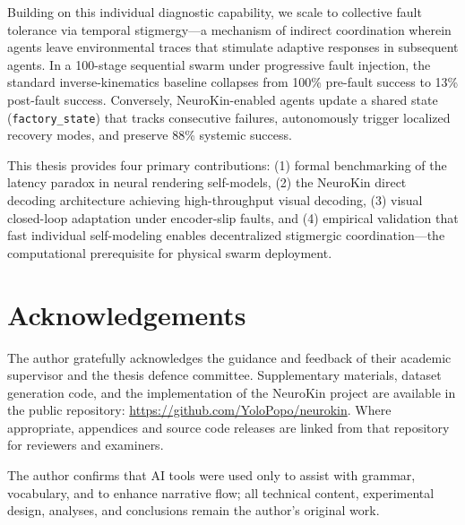 \documentclass[12pt,a4paper,oneside]{report}
\begin{document}
Building on this individual diagnostic capability, we scale to collective fault tolerance via temporal stigmergy—a mechanism of indirect coordination wherein agents leave environmental traces that stimulate adaptive responses in subsequent agents. In a 100-stage sequential swarm under progressive fault injection, the standard inverse-kinematics baseline collapses from 100\% pre-fault success to 13\% post-fault success. Conversely, NeuroKin-enabled agents update a shared state (\texttt{factory\_state}) that tracks consecutive failures, autonomously trigger localized recovery modes, and preserve 88\% systemic success.

This thesis provides four primary contributions: (1) formal benchmarking of the latency paradox in neural rendering self-models, (2) the NeuroKin direct decoding architecture achieving high-throughput visual decoding, (3) visual closed-loop adaptation under encoder-slip faults, and (4) empirical validation that fast individual self-modeling enables decentralized stigmergic coordination—the computational prerequisite for physical swarm deployment.

\clearpage

\chapter*{Acknowledgements}

The author gratefully acknowledges the guidance and feedback of their academic supervisor and the thesis defence committee. Supplementary materials, dataset generation code, and the implementation of the NeuroKin project are available in the public repository: \url{https://github.com/YoloPopo/neurokin}. Where appropriate, appendices and source code releases are linked from that repository for reviewers and examiners.

The author confirms that AI tools were used only to assist with grammar, vocabulary, and to enhance narrative flow; all technical content, experimental design, analyses, and conclusions remain the author's original work.

\clearpage

\tableofcontents
\clearpage
\listoffigures
{}
\clearpage
\listoftables
{}
\clearpage


\end{document}
